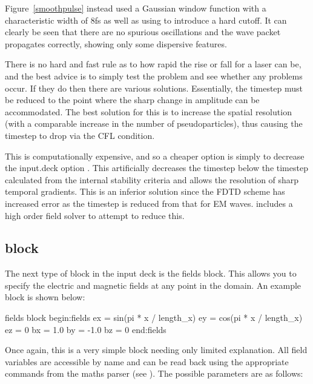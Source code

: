 
Figure~\ref{smoothpulse} instead used a Gaussian window function with a
characteristic width of 8fs as well as using  to introduce
a hard cutoff. It can clearly be seen that there are no spurious oscillations
and the wave packet propagates correctly, showing only some dispersive
features.

There is no hard and fast rule as to how rapid the rise or fall for a laser can
be, and the best advice is to simply test the problem and see whether any
problems occur. If they do then there are various solutions. Essentially, the
timestep must be reduced to the point where the sharp change in amplitude can
be accommodated. The best solution for this is to increase the spatial
resolution (with a comparable increase in the number of pseudoparticles), thus
causing the timestep to drop via the CFL condition.

This is computationally expensive, and so a cheaper option is simply to
decrease the input.deck option . This artificially
decreases the timestep below the timestep calculated from the internal
stability criteria and allows the resolution of sharp temporal gradients. This
is an inferior solution since the FDTD scheme has increased error as the
timestep is reduced from that for EM waves. {\EPOCH}
includes a high order field solver to attempt to reduce this.

\subsection{\texorpdfstring
  { block}
  {           {fields} block}}
\label{sec:fields_block}
The next type of block in the {\EPOCH} input deck is the fields block. This
allows you to specify the electric and magnetic fields at any point in the
domain. An example block is shown below:
\begin{lboxverbatim}{fields block}
begin:fields
   ex = sin(pi * x / length_x)
   ey = cos(pi * x / length_x)
   ez = 0
   bx = 1.0
   by = -1.0
   bz = 0
end:fields
\end{lboxverbatim}

Once again, this is a very simple block needing only limited
explanation. All field variables are accessible by name and can be read back
using the appropriate commands from the maths parser (see ).
The possible parameters are as follows:\\

